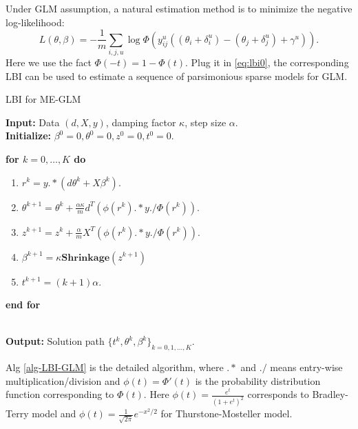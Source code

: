 \documentclass[10pt,journal,cspaper,compsoc]{IEEEtran}
\begin{document}
{Under GLM assumption, a natural estimation method is to minimize the negative log-likelihood:
\begin{equation}\label{eq:likelihood}
L(\theta,\beta) = -\frac{1}{m}\sum_{i,j,u}\log\Phi(y^u_{ij}((\theta_i+\delta_i^u) - (\theta_j+\delta_j^u) + \gamma^u)).
\end{equation}
Here we use the fact $\Phi(-t) = 1-\Phi(t)$. Plug it in \eqref{eq:lbi0}, the corresponding LBI can be used to estimate a sequence of parsimonious sparse models for GLM.

\begin{algorithm}
\caption{LBI for ME-GLM}\label{alg-LBI-GLM}
\textbf{Input:} Data $(d,X,y)$, damping factor $\kappa$, step size $\alpha$.\\
\textbf{Initialize:} $\beta^0 = 0,\theta^0 = 0,z^0=0,t^0=0$.\\
{\textbf{for $k=0,\dots,K$ do}
\begin{enumerate}
\item $r^k = y.*(d\theta^k + X\beta^k)$.
\item $\theta^{k+1} = \theta^k +  \frac{\alpha\kappa}{m}   d^T(\phi(r^k).*y./\Phi(r^k))$.
\item $z^{k+1}  =z^{k} + \frac{\alpha}{m} X^T(\phi(r^k).*y./\Phi(r^k))$.
\item $\beta^{k+1} = \kappa\mathbf{Shrinkage}(z^{k+1})$
\item $t^{k+1} = (k+1)\alpha$.
\end{enumerate}
\textbf{end for}}\\
\textbf{Output:} Solution path $\{t^k, \theta^k,\beta^k\}_{k= 0,1,\dots,K}$.
\end{algorithm}
Alg \ref{alg-LBI-GLM} is the detailed algorithm, where $.*$ and $./$ means entry-wise multiplication/division and $\phi(t) = \Phi'(t)$ is the probability distribution function corresponding to $\Phi(t)$. Here $\phi(t) =  \frac{e^t}{(1+e^{t})^2}$ corresponds to Bradley-Terry model and $\phi(t) = \frac{1}{\sqrt{2\pi}}e^{-x^2/2}$ for Thurstone-Mosteller model.


}
\end{document}
